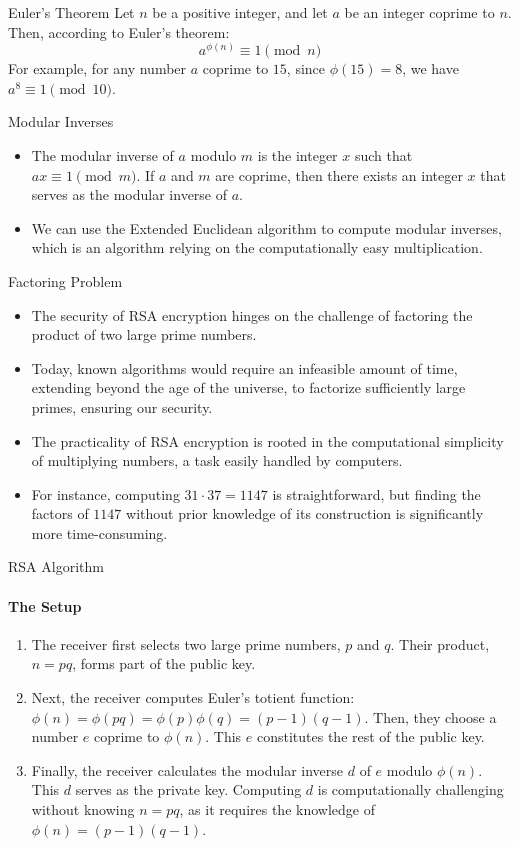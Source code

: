 \documentclass{beamer}
\begin{document}
\begin{frame}{Euler's Theorem}
    Let $n$ be a positive integer, and let $a$ be an integer coprime to $n$. Then, according to Euler's theorem:
    \[
        a^{\phi(n)} \equiv 1 \pmod{n}    
    \]
    For example, for any number $a$ coprime to $15$, since $\phi(15) = 8$, we have $a^{8} \equiv 1 \pmod{10}$. 
\end{frame}

\begin{frame}{Modular Inverses}
    \begin{itemize}
        \item The modular inverse of $a$ modulo $m$ is the integer $x$ such that $ax \equiv 1 \pmod{m}$. If $a$ and $m$ are coprime, then there exists an integer $x$ that serves as the modular inverse of $a$.
        \item We can use the Extended Euclidean algorithm to compute modular inverses, which is an algorithm relying on the computationally easy multiplication.
    \end{itemize}
\end{frame}

\begin{frame}{Factoring Problem}
    \begin{itemize}
        \item The security of RSA encryption hinges on the challenge of factoring the product of two large prime numbers.
        \item Today, known algorithms would require an infeasible amount of time, extending beyond the age of the universe, to factorize sufficiently large primes, ensuring our security.
        \item The practicality of RSA encryption is rooted in the computational simplicity of multiplying numbers, a task easily handled by computers.
        \item For instance, computing $31 \cdot 37 = 1147$ is straightforward, but finding the factors of $1147$ without prior knowledge of its construction is significantly more time-consuming.
    \end{itemize}
\end{frame}

\begin{frame}{RSA Algorithm}
    \framesubtitle{The Setup}
    \begin{enumerate}
        \item The receiver first selects two large prime numbers, $p$ and $q$. Their product, $n = pq$, forms part of the public key.
        \item Next, the receiver computes Euler's totient function: $\phi(n) = \phi(pq) = \phi(p)\phi(q) = (p-1)(q-1)$. Then, they choose a number $e$ coprime to $\phi(n)$. This $e$ constitutes the rest of the public key.
        \item Finally, the receiver calculates the modular inverse $d$ of $e$ modulo $\phi(n)$. This $d$ serves as the private key. Computing $d$ is computationally challenging without knowing $n = pq$, as it requires the knowledge of $\phi(n) = (p-1)(q-1)$. 
    \end{enumerate}
\end{frame}
\end{document}
